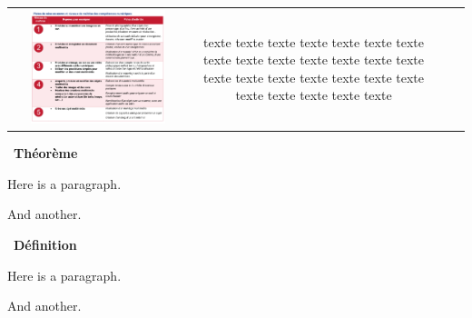 \documentclass[
  11pt,
]{article}
\newcounter{thme}
\newenvironment{theoreme}[1]
{\par \medskip  \addtocounter{thme}{1} \noindent  
\begin{bclogo}[arrondi =0.1,  ombre = true, barre=none, logo=\bcbook, marge=4]{~\textbf{Théorème} \textbf{\thethme} {\itshape #1} }   \par}
{
\end{bclogo}
 \par \bigskip}
\newcounter{def}
\newenvironment{definition}[1]
{\par \medskip   \addtocounter{def}{1} \noindent  
\begin{bclogo}[arrondi =0.1,  ombre = true, barre=none, logo=\bcbook, marge=4]{~\textbf{Définition} \textbf{\thedef} {\itshape #1} }  \par}
{
\end{bclogo}
 \par \bigskip }
\begin{document}
\begin{center}
\begin{tabular}{cccc}
\begin{minipage}{0.2\linewidth}
\includegraphics[width=0.8\textwidth,height=\textheight]{image.png}

\end{minipage} &

\begin{minipage}{0.2\linewidth}

texte texte texte texte texte texte texte texte texte texte texte texte
texte texte texte texte texte texte texte texte texte texte texte texte
texte texte

\end{minipage} \end{tabular}

\end{center}

\begin{theoreme}{}

Here is a paragraph.

And another.

\end{theoreme}

\begin{definition}{}

Here is a paragraph.

And another.

\end{definition}
\end{document}

